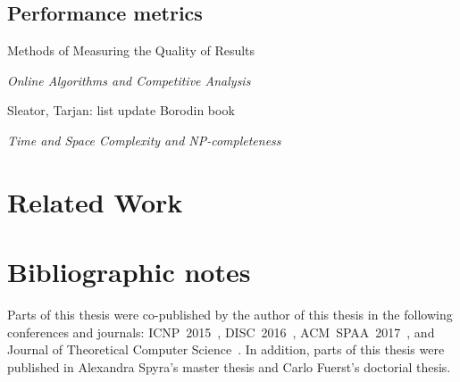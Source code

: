 \subsection{Performance metrics}



Methods of Measuring the Quality of Results

\emph{Online Algorithms and Competitive Analysis}

Sleator, Tarjan: list update \cite{competitive-analysis}
Borodin book \cite{borodin-book}

\emph{Time and Space Complexity and NP-completeness}


\section{Related Work}





\section{Bibliographic notes}

Parts of this thesis were co-published by the author of this thesis in the following conferences and journals: ICNP~2015~\cite{my-icnp}, DISC~2016~\cite{my-disc}, ACM~SPAA~2017~\cite{my-spaa}, and Journal of Theoretical Computer Science~\cite{my-tcs}.
In addition, parts of this thesis were published in Alexandra Spyra's master thesis and Carlo Fuerst's doctorial thesis.